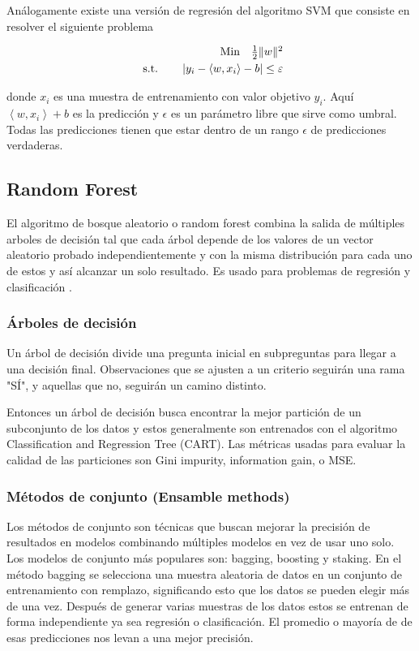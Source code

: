 Análogamente existe una versión de regresión del algoritmo SVM que consiste en resolver el siguiente problema

\[
\begin{array}{r@{}r@{}r@{}l}
	\text{Min} \quad \frac{1}{2}\|w\|^{2} \\[\jot]
	\text{s.t.}\qquad \left|y_{i}-\left\langle w, x_{i}\right\rangle-b\right| \leq \varepsilon \\
	
\end{array}
\]

donde $x_i$ es una muestra de entrenamiento con valor objetivo $y_i$. Aquí $\left\langle w, x_{i}\right\rangle+b$ es la predicción y $\epsilon$ es un parámetro libre que sirve como umbral. Todas las predicciones tienen que estar dentro de un rango $\epsilon$ de predicciones verdaderas. 

\subsection{Random Forest}
El algoritmo de bosque aleatorio o random forest combina la salida de múltiples arboles de decisión tal que cada árbol depende de los valores de un vector aleatorio probado independientemente y con la misma distribución para cada uno de estos y así alcanzar un solo resultado. Es usado para problemas de regresión y clasificación \cite{WhatRandomForest2021}.

\subsubsection{Árboles de decisión}
Un árbol de decisión divide una pregunta inicial en subpreguntas para llegar a una decisión final. Observaciones que se ajusten a un criterio seguirán una rama "SÍ", y aquellas que no, seguirán un camino distinto.

Entonces un árbol de decisión busca encontrar la mejor partición de un subconjunto de los datos y estos generalmente son entrenados con el algoritmo Classification and Regression Tree (CART).
Las métricas usadas para evaluar la calidad de las particiones son Gini impurity, information gain, o MSE.   

\subsubsection{Métodos de conjunto (Ensamble methods)}

Los métodos de conjunto son técnicas que buscan mejorar la precisión de resultados en modelos combinando múltiples modelos en vez de usar uno solo. Los modelos de conjunto más populares son: bagging, boosting y staking.
En el método bagging se selecciona una muestra aleatoria de datos en un conjunto de entrenamiento con remplazo, significando esto que los datos se pueden elegir más de una vez. Después de generar varias muestras de los datos estos se entrenan de forma independiente ya sea regresión o clasificación. El promedio o mayoría de de esas predicciones nos levan a una mejor precisión.   

